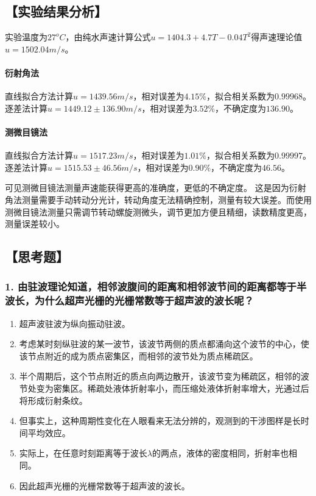 \documentclass[12pt,a4paper,UTF8]{ctexart}
\begin{document}
\subsection*{【实验结果分析】}
实验温度为$27^oC$，由纯水声速计算公式$u = 1404.3 + 4.7T - 0.04T^2$\cite{LUBBERS19981065}得声速理论值$u = 1502.04 m/s$。

\paragraph{衍射角法} 直线拟合方法计算$u = 1439.56 m/s$，相对误差为$4.15\%$，拟合相关系数为$0.99968$。逐差法计算$u = 1449.12 \pm 136.90 m/s$，相对误差为$3.52\%$，不确定度为$136.90$。

\paragraph{测微目镜法} 直线拟合方法计算$u = 1517.23 m/s$，相对误差为$1.01\%$，拟合相关系数为$0.99997$。逐差法计算$u = 1515.53 \pm 46.56 m/s$，相对误差为$0.90\%$，不确定度为$46.56$。

可见测微目镜法测量声速能获得更高的准确度，更低的不确定度。
这是因为衍射角法测量需要手动转动分光计，转动角度无法精确控制，测量有较大误差。而使用测微目镜法测量只需调节转动螺旋测微头，调节更加方便且精细，读数精度更高，测量误差较小。
\printbibliography[title=参考文献] %


\subsection*{【思考题】}
	\subsubsection*{1. 由驻波理论知道，相邻波腹间的距离和相邻波节间的距离都等于半波长，为什么超声光栅的光栅常数等于超声波的波长呢？}
		\begin{enumerate}[label=\arabic*.]
			\item 超声波驻波为纵向振动驻波。
			\item 考虑某时刻纵驻波的某一波节，该波节两侧的质点都涌向这个波节的中心，使该节点附近的成为质点密集区，而相邻的波节处为质点稀疏区。
			\item 半个周期后，这个节点附近的质点向两边散开，该波节变为稀疏区，相邻的波节处变为密集区。稀疏处液体折射率小，而压缩处液体折射率增大，光通过后将形成衍射条纹。
			\item 但事实上，这种周期性变化在人眼看来无法分辨的，观测到的干涉图样是长时间平均效应。
			\item 实际上，在任意时刻距离等于波长$\lambda$的两点，液体的密度相同，折射率也相同。
			\item 因此超声光栅的光栅常数等于超声波的波长。
		\end{enumerate}
\end{document}
